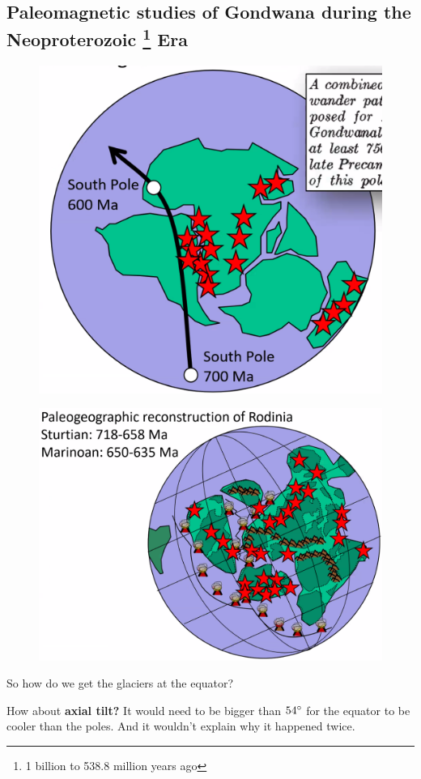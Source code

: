 \subsection{Paleomagnetic studies of Gondwana during the Neoproterozoic
\footnote{1 billion to 538.8 million years ago} Era}

\begin{figure}[H]
    \centering
    \includegraphics[width=0.75\linewidth]{content/img/gondwana.png}
\end{figure}

\begin{figure}[H]
    \centering
    \includegraphics[width=0.75\linewidth]{
    content/img/rodinia_snowball_earth.png}
\end{figure}

So how do we get the glaciers at the equator?

How about \textbf{axial tilt?} It would need to be bigger than $54 \degree$
for the equator to be cooler than the poles. And it wouldn't explain why it
happened twice.

